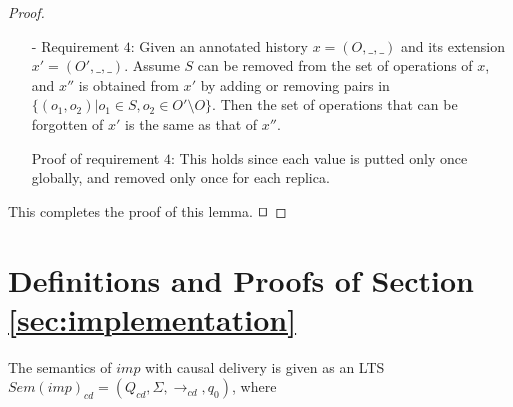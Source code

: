 \begin {proof}
\begin{itemize}
\item[-] Requirement $4$: Given an annotated history $x = (O,\_,\_)$ and its extension $x' = (O',\_,\_)$. Assume $S$ can be removed from the set of operations of $x$, and $x''$ is obtained from $x'$ by adding or removing pairs in $\{ (o_1,o_2) \vert o_1 \in S, o_2 \in O' \setminus O \}$. Then the set of operations that can be forgotten of $x'$ is the same as that of $x''$.

    Proof of requirement $4$: This holds since each value is putted only once globally, and removed only once for each replica.
\end{itemize}

This completes the proof of this lemma. $\qed$
\end {proof}










\section{Definitions and Proofs of Section \ref{sec:implementation}}
\label{sec:appendix definitions and proofs of section implementation}

The semantics of $\mathit{imp}$ with causal delivery is given as an LTS $\mathit{Sem}(\mathit{imp})_{\mathit{cd}} = (Q_{\mathit{cd}},\Sigma,\rightarrow_{\mathit{cd}},q_0)$, where

